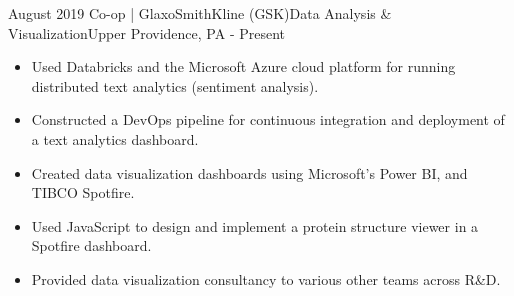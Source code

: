 %
%
%
\begin{experiences}
  \experience
    {August 2019}   {Co-op | GlaxoSmithKline (GSK)}{Data Analysis \& Visualization}{Upper Providence, PA}
    {- Present} {
    \begin{itemize}
    \item Used Databricks and the Microsoft Azure cloud platform for running distributed text analytics (sentiment analysis).
    \item Constructed a DevOps pipeline for continuous integration and deployment of a text analytics dashboard.
    \item Created data visualization dashboards using Microsoft's Power BI, and TIBCO Spotfire.
    \item Used JavaScript to design and implement a protein structure viewer in a Spotfire dashboard.
    \item Provided data visualization consultancy to various other teams across R\&D.
    \end{itemize}
    }
                   

\end{experiences}
